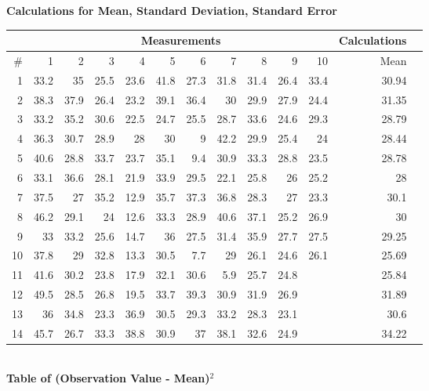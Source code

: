 \documentclass[12pt,a4paper,oneside]{article}
\begin{document}
\textbf{Calculations for Mean, Standard Deviation, Standard Error} \\
\begin{tabular}{ | r | r | r | r | r | r | r | r | r | r | r | r | r | }
    \hline
    & \multicolumn{10}{|c|}{Measurements} & \multicolumn{1}{|c|}{Calculations} \\ \hline
    \# & 1 & 2 & 3 & 4 & 5 & 6 & 7 & 8 & 9 & 10 & Mean \\ \hline
    1 & 33.2 & 35 & 25.5 & 23.6 & 41.8 & 27.3 & 31.8 & 31.4 & 26.4 & 33.4 & 30.94 \\ \hline
    2 & 38.3 & 37.9 & 26.4 & 23.2 & 39.1 & 36.4 & 30 & 29.9 & 27.9 & 24.4 & 31.35 \\ \hline
    3 & 33.2 & 35.2 & 30.6 & 22.5 & 24.7 & 25.5 & 28.7 & 33.6 & 24.6 & 29.3 & 28.79 \\ \hline
    4 & 36.3 & 30.7 & 28.9 & 28 & 30 & 9 & 42.2 & 29.9 & 25.4 & 24 & 28.44 \\ \hline
    5 & 40.6 & 28.8 & 33.7 & 23.7 & 35.1 & 9.4 & 30.9 & 33.3 & 28.8 & 23.5 & 28.78 \\ \hline
    6 & 33.1 & 36.6 & 28.1 & 21.9 & 33.9 & 29.5 & 22.1 & 25.8 & 26 & 25.2 & 28\\ \hline
    7 & 37.5 & 27 & 35.2 & 12.9 & 35.7 & 37.3 & 36.8 & 28.3 & 27 & 23.3 & 30.1 \\ \hline
    8 & 46.2 & 29.1 & 24 & 12.6 & 33.3 & 28.9 & 40.6 & 37.1 & 25.2 & 26.9 & 30\\ \hline
    9 & 33 & 33.2 & 25.6 & 14.7 & 36 & 27.5 & 31.4 & 35.9 & 27.7 & 27.5 & 29.25 \\ \hline
    10 & 37.8 & 29 & 32.8 & 13.3 & 30.5 & 7.7 & 29 & 26.1 & 24.6 & 26.1 & 25.69 \\ \hline
    11 & 41.6 & 30.2 & 23.8 & 17.9 & 32.1 & 30.6 & 5.9 & 25.7 & 24.8 &  & 25.84 \\ \hline
    12 & 49.5 & 28.5 & 26.8 & 19.5 & 33.7 & 39.3 & 30.9 & 31.9 & 26.9 &  & 31.89 \\ \hline
    13 & 36 & 34.8 & 23.3 & 36.9 & 30.5 & 29.3 & 33.2 & 28.3 & 23.1 &  & 30.6 \\ \hline
    14 & 45.7 & 26.7 & 33.3 & 38.8 & 30.9 & 37 & 38.1 & 32.6 & 24.9 &  & 34.22 \\ \hline
\end{tabular}
\\
\newpage
\textbf{Table of (Observation Value - Mean)$^{2}$}\\
\end{document}
